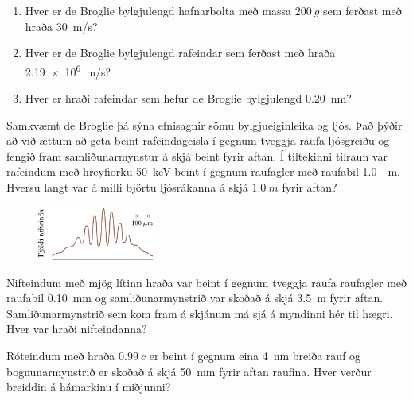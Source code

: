 \ifdefined \wholebook \else\documentclass[oneside]{book}\usepackage{EdlBook}\graphicspath{{figures/}}
\begin{document}
\begin{enumerate}[label = \textbf{(\alph*)}]



\item[\textbf{(38.16)}] \begin{enumerate}[label = \textbf{(\alph*)}]
    \item Hver er de Broglie bylgjulengd hafnarbolta með massa $\SI{200}{g}$ sem ferðast með hraða \SI{30}{m/s}?
    \item Hver er de Broglie bylgjulengd rafeindar sem ferðast með hraða \SI{2.19e6}{m/s}?
    \item Hver er hraði rafeindar sem hefur de Broglie bylgjulengd \SI{0.20}{nm}?
\end{enumerate}

\item[\textbf{(38.47)}] Samkvæmt de Broglie þá sýna efnisagnir sömu bylgjueiginleika og ljós. Það þýðir að við ættum að geta beint rafeindageisla í gegnum tveggja raufa ljósgreiðu og fengið fram samliðunarmynstur á skjá beint fyrir aftan. Í tiltekinni tilraun var rafeindum með hreyfiorku \SI{50}{keV} beint í gegnum raufagler með raufabil \SI{1.0}{\mu m}. Hversu langt var á milli björtu ljósrákanna á skjá $\SI{1.0}{m}$ fyrir aftan?

\begin{minipage}{\linewidth}
\begin{figure}
\vspace{-0.5cm}
\includegraphics[width = 1.5in]{figures/fjoldi-nift.pdf}
\end{figure}

\item[\textbf{(38.49)}] Nifteindum með mjög lítinn hraða var beint í gegnum tveggja raufa raufagler með raufabil \SI{0.10}{mm} og samliðunarmynstrið var skoðað á skjá \SI{3.5}{m} fyrir aftan. Samliðunarmynstrið sem kom fram á skjánum má sjá á myndinni hér til hægri. Hver var hraði nifteindanna?

\end{minipage}

\item[\textbf{(38.48)}] Róteindum með hraða $\SI{0.99}{}c$ er beint í gegnum eina \SI{4}{nm} breiða rauf og bognunarmynstrið er skoðað á skjá \SI{50}{mm} fyrir aftan raufina. Hver verður breiddin á hámarkinu í miðjunni?


\end{enumerate}
\end{document}

